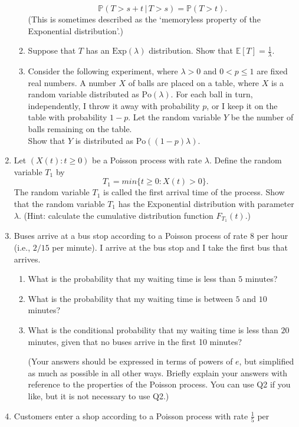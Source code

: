 \documentclass[11pt,a4paper]{article}
\begin{document}
\begin{enumerate}
\begin{enumerate}
            $$\mathbb{P}(T > s + t\, |\, T > s) = \mathbb{P}(T > t).$$
            (This is sometimes described as the ‘memoryless property of the Exponential distribution’.)
            \item  Suppose that $T$ has an $\text{Exp}(\lambda)$ distribution. Show that $\mathbb{E}[T] = \frac{1}{\lambda}$.
            \item Consider the following experiment, where $\lambda > 0$ and $0 < p \leq 1$ are fixed real numbers. A number $X$ of balls are placed on a table, where $X$ is a random variable distributed as $\text{Po}(\lambda)$. For each ball in turn, independently, I throw it away with probability $p$, or I keep it on the table with probability $1 − p$. Let the random variable $Y$ be the number of balls remaining on the table.\\
            Show that $Y$ is distributed as $\text{Po}((1 − p)\lambda)$.
        \end{enumerate}
        \item  Let $(X(t) : t \geq 0)$ be a Poisson process with rate $\lambda$. Define the random variable $T_1$ by
        $$T_1 = min\{t \geq 0 : X(t) > 0\}.$$
        The random variable $T_1$ is called the first arrival time of the process. Show that the random variable $T_1$ has the Exponential distribution with parameter $\lambda$. (Hint: calculate the cumulative distribution function $F_{T_1}(t)$.)
        \item  Buses arrive at a bus stop according to a Poisson process of rate $8$ per hour (i.e., $2/15$ per minute). I arrive at the bus stop and I take the first bus that arrives.
        \begin{enumerate}
            \item What is the probability that my waiting time is less than $5$ minutes?
            \item What is the probability that my waiting time is between $5$ and $10$ minutes?
            \item What is the conditional probability that my waiting time is less than $20$ minutes, given that no buses arrive in the first 10 minutes?\par
            (Your answers should be expressed in terms of powers of $e$, but simplified as much as possible in all other ways. Briefly explain your answers with reference to the properties of the Poisson process. You can use Q2 if you like, but it is not necessary to use Q2.)            
        \end{enumerate}
        \item Customers enter a shop according to a Poisson process with rate $\frac{1}{5}$ per

\end{enumerate}
\end{document}
